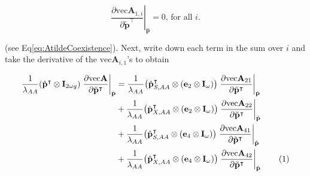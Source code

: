 \documentclass[11pt]{article}
\newcommand\numberthis{\addtocounter{equation}{1}\tag{\theequation}}
\def\mbf#1{\mathbf{#1}}
\begin{document}
\begin{equation}
	\left. \frac{ \partial \text{vec}\mbf{A}_{1,i}}{\partial \tilde{\mbf{p}}^{\intercal}} \right|_{\hat{\mbf{p}}} = 0,\,\text{for all }i. 
\end{equation}

\noindent (see Eq{\ref{eq:AtildeCoexistence}}). Next, write down each term in the sum over $i$ and take the derivative  of the $\text{vec}\mbf{A}_{i,1}$'s to obtain

\begin{align*}
	\frac{1}{\lambda_{AA}}(\hat{\mbf{p}}^{\intercal} \otimes \mbf{I}_{2 \omega g}) \left. \frac{ \partial \text{vec}\mbf{A}}{\partial \tilde{\mbf{p}}^{\intercal}} \right|_{\hat{\mbf{p}}} &= \frac{1}{\lambda_{AA}} \big( \hat{\mbf{p}}^{\intercal}_{S,AA} \otimes (\mbf{e}_{2} \otimes \mbf{I}_{\omega}) \big) \left. \frac{ \partial \text{vec}\mbf{A}_{21}}{\partial \tilde{\mbf{p}}^{\intercal}} \right|_{\hat{\mbf{p}}} \\
		&+ \frac{1}{\lambda_{AA}} \big( \hat{\mbf{p}}^{\intercal}_{X,AA} \otimes (\mbf{e}_{2} \otimes \mbf{I}_{\omega}) \big) \left. \frac{ \partial \text{vec}\mbf{A}_{22}}{\partial \tilde{\mbf{p}}^{\intercal}} \right|_{\hat{\mbf{p}}} \\
		&+\frac{1}{\lambda_{AA}} \big( \hat{\mbf{p}}^{\intercal}_{S,AA} \otimes (\mbf{e}_{4} \otimes \mbf{I}_{\omega}) \big) \left. \frac{ \partial \text{vec}\mbf{A}_{41}}{\partial \tilde{\mbf{p}}^{\intercal}} \right|_{\hat{\mbf{p}}} \\
		&+ \frac{1}{\lambda_{AA}} \big( \hat{\mbf{p}}^{\intercal}_{X,AA} \otimes (\mbf{e}_{4} \otimes \mbf{I}_{\omega}) \big) \left. \frac{ \partial \text{vec}\mbf{A}_{42}}{\partial \tilde{\mbf{p}}^{\intercal}} \right|_{\hat{\mbf{p}}} \numberthis
\end{align*}
\end{document}
